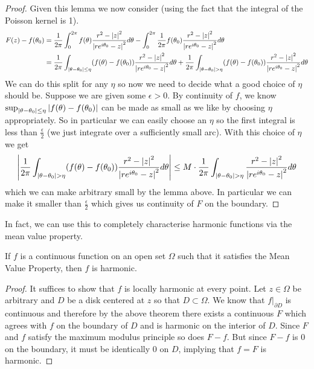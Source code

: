 \begin{proof}
Given this lemma we now consider (using the fact that the integral of the Poisson kernel is 1). 
\begin{align*}
    F(z) - f(\theta_0) &= \frac{1}{2\pi} \int_0^{2\pi} f(\theta) \frac{r^2 - \left|z\right|^2}{\left|re^{i\theta_0} - z\right|^2} d\theta - \int_0^{2\pi} \frac{1}{2\pi} f(\theta_0) \frac{r^2 - \left|z\right|^2}{\left|re^{i\theta_0} - z\right|^2} d\theta\\
    &= \frac{1}{2\pi} \int_{\left|\theta - \theta_0\right| \leq \eta} (f(\theta) - f(\theta_0)) \frac{r^2 - \left|z\right|^2}{\left|re^{i\theta_0} - z\right|^2} d\theta + \frac{1}{2\pi} \int_{\left|\theta - \theta_0\right| > \eta} (f(\theta) - f(\theta_0)) \frac{r^2 - \left|z\right|^2}{\left|re^{i\theta_0} - z\right|^2} d\theta
\end{align*}
We can do this split for any $\eta$ so now we need to decide what a good choice of $\eta$ should be. Suppose we are given some $\epsilon > 0$. By continuity of $f$, we know $\sup_{\left|\theta - \theta_0\right| \leq \eta} \left|f(\theta) - f(\theta_0)\right|$ can be made as small as we like by choosing $\eta$ appropriately. So in particular we can easily choose an $\eta$ so the first integral is less than $\frac{\epsilon}{2}$ (we just integrate over a sufficiently small arc). With this choice of $\eta$ we get 
$$\left|\frac{1}{2\pi} \int_{\left|\theta - \theta_0\right| > \eta} (f(\theta) - f(\theta_0)) \frac{r^2 - \left|z\right|^2}{\left|re^{i\theta_0} - z\right|^2} d\theta\right| \leq M \cdot \frac{1}{2\pi}\int_{\left|\theta - \theta_0\right| > \eta}\frac{r^2 - \left|z\right|^2}{\left|re^{i\theta_0} - z\right|^2} d\theta $$
which we can make arbitrary small by the lemma above. In particular we can make it smaller than $\frac{\epsilon}{2}$ which gives us continuity of $F$ on the boundary.
\end{proof}

In fact, we can use this to completely characterise harmonic functions via the mean value property.
\begin{theorem}
    If $f$ is a continuous function on an open set $\Omega$ such that it satisfies the Mean Value Property, then $f$ is harmonic.
\end{theorem}
\begin{proof}
    It suffices to show that $f$ is locally harmonic at every point. Let $z \in \Omega$ be arbitrary and $D$ be a disk centered at $z$ so that $D \subset \Omega$. We know that $f|_{\partial D}$ is continuous and therefore by the above theorem there exists a continuous $F$ which agrees with $f$ on the boundary of $D$ and is harmonic on the interior of $D$. Since $F$ and $f$ satisfy the maximum modulus principle so does $F - f$. But since $F - f$ is 0 on the boundary, it must be identically 0 on $D$, implying that $f = F$ is harmonic.
\end{proof}

